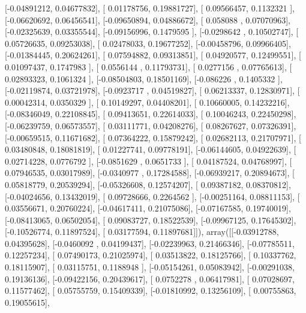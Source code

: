 \documentclass{article}
\begin{document}
       [-0.04891212,  0.04677832],
       [ 0.01178756,  0.19881727],
       [ 0.09566457,  0.1132321 ],
       [-0.06620692,  0.06456541],
       [-0.09650894,  0.04886672],
       [ 0.058088  ,  0.07070963],
       [-0.02325639,  0.03355544],
       [-0.09156996,  0.1479595 ],
       [-0.0298642 ,  0.10502747],
       [ 0.05726635,  0.09253038],
       [ 0.02478033,  0.19677252],
       [-0.00458796,  0.09966405],
       [-0.01384445,  0.20624261],
       [ 0.07594882,  0.09313851],
       [ 0.04920577,  0.12499551],
       [ 0.01097437,  0.1747983 ],
       [ 0.0556144 ,  0.11793731],
       [ 0.0277156 ,  0.07765613],
       [ 0.02893323,  0.1061324 ],
       [-0.08504803,  0.18501169],
       [-0.086226  ,  0.1405332 ],
       [-0.02119874,  0.03721978],
       [-0.0923717 ,  0.04519827],
       [ 0.06213337,  0.12830971],
       [ 0.00042314,  0.0350329 ],
       [ 0.10149297,  0.04408201],
       [ 0.10660005,  0.14232216],
       [-0.08346049,  0.22108845],
       [ 0.09413651,  0.22614033],
       [ 0.10046243,  0.22450298],
       [-0.06239759,  0.06573557],
       [ 0.03111771,  0.04208276],
       [ 0.08267627,  0.07326391],
       [-0.00659515,  0.11671682],
       [ 0.07364222,  0.15879242],
       [ 0.02682113,  0.21707971],
       [ 0.03480848,  0.18081819],
       [ 0.01227741,  0.09778191],
       [-0.06144605,  0.04922639],
       [ 0.02714228,  0.0776792 ],
       [-0.0851629 ,  0.0651733 ],
       [ 0.04187524,  0.04768997],
       [ 0.07946535,  0.03017989],
       [-0.0340977 ,  0.17284588],
       [-0.06939217,  0.20894673],
       [ 0.05818779,  0.20539294],
       [-0.05326608,  0.12574207],
       [ 0.09387182,  0.08370812],
       [-0.04024656,  0.13432019],
       [ 0.09728666,  0.2264562 ],
       [-0.00251164,  0.08811153],
       [ 0.03556671,  0.20760224],
       [-0.04617411,  0.21075086],
       [-0.07167585,  0.19740019],
       [-0.08413065,  0.06502054],
       [ 0.09083727,  0.18522539],
       [-0.09967125,  0.17645302],
       [-0.10526774,  0.11897524],
       [ 0.03177594,  0.11897681]]), array([[-0.03912788,  0.04395628],
       [-0.0460092 ,  0.04199437],
       [-0.02239963,  0.21466346],
       [-0.07785511,  0.12257234],
       [ 0.07490173,  0.21025974],
       [ 0.03513822,  0.18125766],
       [ 0.10337762,  0.18115907],
       [ 0.03115751,  0.1188948 ],
       [-0.05154261,  0.05083942],
       [-0.00291038,  0.19136136],
       [-0.09422156,  0.20439617],
       [ 0.0752278 ,  0.06417981],
       [ 0.07028697,  0.11577462],
       [ 0.05755759,  0.15409339],
       [-0.01810992,  0.13256109],
       [ 0.00755863,  0.19055615],
\end{document}
